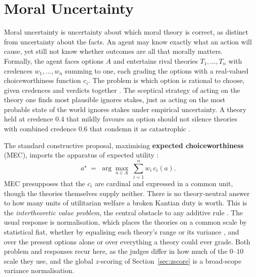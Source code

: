 \documentclass[10pt,twocolumn,a4paper]{article}
\let\cite\citep
\begin{document}
\section{Moral Uncertainty}
\label{sec:background}

Moral uncertainty is uncertainty about which moral theory is correct, as
distinct from uncertainty about the facts. An agent may know exactly what an
action will cause, yet still not know whether outcomes are all that morally
matters. Formally, the agent faces options $A$ and entertains rival theories
$T_1, \dots, T_n$ with credences $w_1, \dots, w_n$ summing to one, each
grading the options with a real-valued choiceworthiness function $c_i$. The
problem is which option is rational to choose, given credences and
verdicts together \cite{macaskill2020}. The sceptical strategy of acting on
the theory one finds most plausible ignores stakes, just as acting on the
most probable state of the world ignores stakes under empirical
uncertainty. A theory held at credence $0.4$ that mildly favours an
option should not silence theories with combined credence $0.6$ that
condemn it as catastrophic \cite{macaskill2020}.

The standard constructive proposal, maximising \textbf{expected
choiceworthiness} (MEC), imports the apparatus of expected utility
\cite{lockhart2000,macaskill2020}:
\[
  a^{\star} \;=\; \arg\max_{a \in A}\; \sum_{i=1}^{n} w_i\, c_i(a).
\]
MEC presupposes that the $c_i$ are cardinal and expressed in a common unit,
though the theories themselves supply neither. There is no theory-neutral answer
to how many units of utilitarian welfare a broken Kantian duty is worth.
This is the \emph{intertheoretic value problem}, the central obstacle to
any additive rule \cite{macaskill2020}. The usual response is
normalisation, which places the theories on a common scale by statistical
fiat, whether by equalising each theory's range \cite{lockhart2000} or
its variance \cite{cottonbarratt2020}, and over the present options alone
or over everything a theory could ever grade. Both problem and responses
recur here, as the judges differ in how much of the $0$--$10$ scale they
use, and the global $z$-scoring of Section~\ref{sec:zscore} is a
broad-scope variance normalisation.
\end{document}
